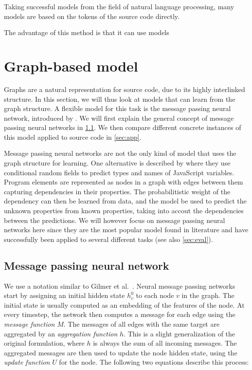 \documentclass[sigconf,authordraft=true,nonacm=true]{acmart}
\begin{document}
Taking successful models from the field of natural language processing, many models are based on the tokens of the source code directly.

The advantage of this method is that it can use models



\section{Graph-based model}
Graphs are a natural representation for source code, due to its highly interlinked structure.
In this section, we will thus look at models that can learn from the graph structure.
A flexible model for this task is the message passing neural network, introduced by \citet{gilmer_neural_2017}.
We will first explain the general concept of message passing neural networks in \cref{sec:mpnn}.
We then compare different concrete instances of this model applied to source code in \cref{sec:app}.

Message passing neural networks are not the only kind of model that uses the graph structure for learning.
One alternative is described by \citet{raychev_predicting_2019} where they use conditional random fields to predict types and names of JavaScript variables.
Program elements are represented as nodes in a graph with edges between them capturing dependencies in their properties.
The probabilitistic weight of the dependency can then be learned from data, and the model be used to predict the unknown properties from known properties, taking into accout the dependencies between the predictions.
We will however focus on message passing neural networks here since they are the most popular model found in literature and have successfully been applied to several different tasks (see also \cref{sec:eval}).

\subsection{Message passing neural network}\label{sec:mpnn}
We use a notation similar to Gilmer et al.~\cite{gilmer_neural_2017}.
Neural message passing networks start by assigning an initial hidden state $h^0_v$ to each node $v$ in the graph.
The initial state is usually computed as an embedding of the features of the node.
At every timestep, the network then computes a message for each edge using the \textit{message function} $M$.
The messages of all edges with the same target are aggregated by an \textit{aggregation function} $h$.
This is a slight generalization of the original formulation, where $h$ is always the sum of all incoming messages.
The aggregated messages are then used to update the node hidden state, using the \textit{update function} $U$ for the node.
The following two equations describe this process:
\end{document}
